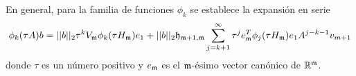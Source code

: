 En general, para la familia de funciones $\phi_k$ se establece la expansión en serie \cite{Saad92,Sidje98}
\begin{equation}
\phi_k(\tau A)b=||b||_2\tau^{k} V_{\mathfrak{m}} \phi_k(\tau H_{\mathfrak{m}})e_1 + ||b||_2\mathfrak{h}_{\mathfrak{m}+1,\mathfrak{m}}
\sum_{j=k+1}^{\infty}\tau^{j} e_{\mathfrak{m}}^T\phi_j(\tau H_{\mathfrak{m}})e_1A^{j-k-1}v_{m+1} \label{PHI-EXPANSION}
\end{equation}
donde $\tau$ es un número positivo y $e_{\mathfrak{m}}$ es el  $\mathfrak{m}$-ésimo vector canónico de $\mathbb{R}^{\mathfrak{m}}$.